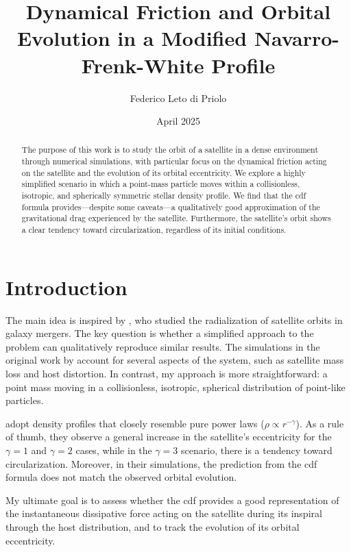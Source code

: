 \documentclass[twocolumn, a4paper]{article}
\title{Dynamical Friction and Orbital Evolution in a Modified Navarro-Frenk-White Profile}
\author{Federico Leto di Priolo}
\date{April 2025}
\begin{document}
\maketitle

\begin{abstract}
    The purpose of this work is to study the orbit of a satellite in a dense environment through numerical simulations, with particular focus on the dynamical friction acting on the satellite and the evolution of its orbital eccentricity. We explore a highly simplified scenario in which a point-mass particle moves within a collisionless, isotropic, and spherically symmetric stellar density profile. We find that the \acrlong{cdf} formula provides—despite some caveats—a qualitatively good approximation of the gravitational drag experienced by the satellite. Furthermore, the satellite’s orbit shows a clear tendency toward circularization, regardless of its initial conditions.
\end{abstract}

\section{Introduction}

The main idea is inspired by \citet{Vasiliev2022}, who studied the radialization of satellite orbits in galaxy mergers. The key question is whether a simplified approach to the problem can qualitatively reproduce similar results. The simulations in the original work by \citeauthor{Vasiliev2022} account for several aspects of the system, such as satellite mass loss and host distortion. In contrast, my approach is more straightforward: a point mass moving in a collisionless, isotropic, spherical distribution of point-like particles.

\citeauthor{Vasiliev2022} adopt density profiles that closely resemble pure power laws (\(\rho \propto r^{-\gamma}\)). As a rule of thumb, they observe a general increase in the satellite's eccentricity for the \(\gamma = 1\) and \(\gamma = 2\) cases, while in the \(\gamma = 3\) scenario, there is a tendency toward circularization. Moreover, in their simulations, the prediction from the \acrfull{cdf} formula does not match the observed orbital evolution.

My ultimate goal is to assess whether the \acrshort{cdf} provides a good representation of the instantaneous dissipative force acting on the satellite during its inspiral through the host distribution, and to track the evolution of its orbital eccentricity.
\end{document}
